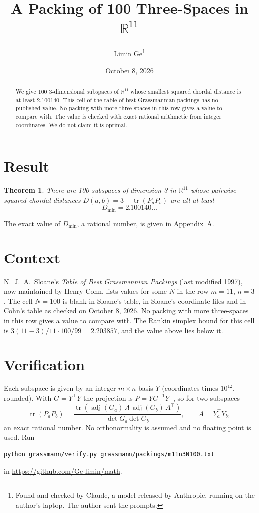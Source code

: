 \documentclass[11pt,a4paper]{article}
\title{A Packing of 100 Three-Spaces in $\mathbb{R}^{11}$}
\author{Limin Ge\thanks{Found and checked by Claude, a model released by Anthropic, running on the author's laptop. The author sent the prompts.}}
\date{October 8, 2026}
\newtheorem*{theorem}{Theorem}
\begin{document}
\maketitle
\begin{abstract}
We give 100 3-dimensional subspaces of $\mathbb{R}^{11}$ whose smallest squared chordal distance is at least 2.100140. This cell of the table of best Grassmannian packings has no published value. No packing with more three-spaces in this row gives a value to compare with. The value is checked with exact rational arithmetic from integer coordinates. We do not claim it is optimal.
\end{abstract}

\section{Result}
\begin{theorem}
There are 100 subspaces of dimension 3 in $\mathbb{R}^{11}$ whose pairwise squared chordal distances $D(a,b) = 3 - \operatorname{tr}(P_aP_b)$ are all at least
\[ D_{\min} = 2.100140\ldots \]
\end{theorem}
The exact value of $D_{\min}$, a rational number, is given in Appendix~A.


\section{Context}
N.~J.~A.~Sloane's \emph{Table of Best Grassmannian Packings} (last modified 1997), now maintained by Henry Cohn, lists values for some $N$ in the row $m=11$, $n=3$. The cell $N=100$ is blank in Sloane's table, in Sloane's coordinate files and in Cohn's table as checked on October 8, 2026. No packing with more three-spaces in this row gives a value to compare with. The Rankin simplex bound for this cell is $3(11-3)/11\cdot 100/99 = 2.203857$, and the value above lies below it.


\section{Verification}
Each subspace is given by an integer $m\times n$ basis $Y$ (coordinates times $10^{12}$, rounded). With $G=Y^\top Y$ the projection is $P=YG^{-1}Y^\top$, so for two subspaces
\[ \operatorname{tr}(P_aP_b)=\frac{\operatorname{tr}(\operatorname{adj}(G_a)\,A\,\operatorname{adj}(G_b)\,A^\top)}{\det G_a\det G_b},\qquad A=Y_a^\top Y_b, \]
an exact rational number. No orthonormality is assumed and no floating point is used. Run
\begin{verbatim}
python grassmann/verify.py grassmann/packings/m11n3N100.txt
\end{verbatim}
in \url{https://github.com/Ge-limin/math}.
\end{document}

